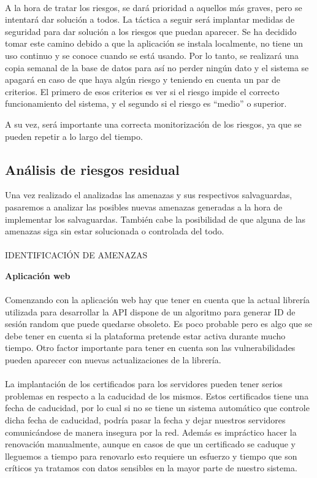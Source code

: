 \paragraph{}
A la hora de tratar los riesgos, se dará prioridad a aquellos más
graves, pero se intentará dar solución a todos. La táctica a seguir
será implantar medidas de seguridad para dar solución a los riesgos
que puedan aparecer. Se ha decidido tomar este camino debido a que la
aplicación se instala localmente, no tiene un uso continuo y se conoce
cuando se está usando. Por lo tanto, se realizará una copia semanal de
la base de datos para así no perder ningún dato y el sistema se
apagará en caso de que haya algún riesgo y teniendo en cuenta un par
de criterios. El primero de esos criterios es ver si el riesgo impide
el correcto funcionamiento del sistema, y el segundo si el riesgo es
“medio” o superior.

A su vez, será importante una correcta monitorización de los riesgos,
ya que se pueden repetir a lo largo del tiempo.

\subsection{Análisis de riesgos residual}

Una vez realizado el analizadas las amenazas y sus respectivos
salvaguardas, pasaremos a analizar las posibles nuevas amenazas
generadas a la hora de implementar los salvaguardas. También cabe la
posibilidad de que alguna de las amenazas siga sin estar solucionada o
controlada del todo.
\paragraph{}
IDENTIFICACIÓN DE AMENAZAS

\textbf{Aplicación web}
\paragraph{}
Comenzando con la aplicación web hay que tener en cuenta que la actual
librería utilizada para desarrollar la API dispone de un algoritmo
para generar ID de sesión random que puede quedarse obsoleto. Es poco
probable pero es algo que se debe tener en cuenta si la plataforma
pretende estar activa durante mucho tiempo. Otro factor importante
para tener en cuenta son las vulnerabilidades pueden aparecer con
nuevas actualizaciones de la librería.
\paragraph{}
La implantación de los certificados para los servidores pueden tener
serios problemas en respecto a la caducidad de los mismos. Estos
certificados tiene una fecha de caducidad, por lo cual si no se tiene
un sistema automático que controle dicha fecha de caducidad, podría
pasar la fecha y dejar nuestros servidores comunicándose de manera
insegura por la red. Además es impráctico hacer la renovación
manualmente, aunque en casos de que un certificado se caduque y
lleguemos a tiempo para renovarlo esto requiere un esfuerzo y tiempo
que son críticos ya tratamos con datos sensibles en la mayor parte de
nuestro sistema.
